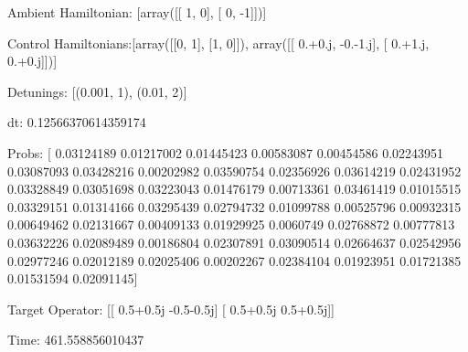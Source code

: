 \documentclass{article}
\begin{document}
    

\newpage

Ambient Hamiltonian: [array([[ 1,  0],
       [ 0, -1]])]

Control Hamiltonians:[array([[0, 1],
       [1, 0]]), array([[ 0.+0.j, -0.-1.j],
       [ 0.+1.j,  0.+0.j]])]

Detunings: [(0.001, 1), (0.01, 2)]

 dt: 0.12566370614359174

Probs: [ 0.03124189  0.01217002  0.01445423  0.00583087  0.00454586  0.02243951
  0.03087093  0.03428216  0.00202982  0.03590754  0.02356926  0.03614219
  0.02431952  0.03328849  0.03051698  0.03223043  0.01476179  0.00713361
  0.03461419  0.01015515  0.03329151  0.01314166  0.03295439  0.02794732
  0.01099788  0.00525796  0.00932315  0.00649462  0.02131667  0.00409133
  0.01929925  0.0060749   0.02768872  0.00777813  0.03632226  0.02089489
  0.00186804  0.02307891  0.03090514  0.02664637  0.02542956  0.02977246
  0.02012189  0.02025406  0.00202267  0.02384104  0.01923951  0.01721385
  0.01531594  0.02091145]

Target Operator: [[ 0.5+0.5j -0.5-0.5j]
 [ 0.5+0.5j  0.5+0.5j]]

Time: 461.558856010437
\end{document}
